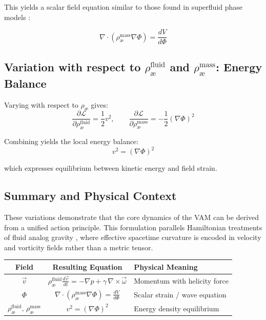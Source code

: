 \documentclass[12pt]{article}
\begin{document}
This yields a scalar field equation similar to those found in superfluid phase models \cite{khalatnikov2000}:

\begin{equation}
    \boxed{
        \nabla \cdot (\rho_\text{\ae}^{\text{mass}} \nabla \Phi) = \frac{dV}{d\Phi}
    }
\end{equation}

\subsection{Variation with respect to \(\rho_\text{\ae}^{\text{fluid}}\) and \(\rho_\text{\ae}^{\text{mass}}\): Energy Balance}

Varying with respect to \( \rho_\text{\ae} \) gives:
\[
    \frac{\partial \mathcal{L}}{\partial \rho_\text{\ae}^{\text{fluid}}} = \frac{1}{2} v^2,
    \qquad
    \frac{\partial \mathcal{L}}{\partial \rho_\text{\ae}^{\text{mass}}} = -\frac{1}{2} (\nabla \Phi)^2
\]

Combining yields the local energy balance:
\begin{equation}
    \boxed{
        v^2 = (\nabla \Phi)^2
    }
\end{equation}

which expresses equilibrium between kinetic energy and field strain.

\subsection*{Summary and Physical Context}

These variations demonstrate that the core dynamics of the VAM can be derived from a unified action principle. This formulation parallels Hamiltonian treatments of fluid analog gravity \cite{barcelo2011}, where effective spacetime curvature is encoded in velocity and vorticity fields rather than a metric tensor.

\begin{center}
    \begin{tabular}{|c|c|l|}
        \hline
        Field & Resulting Equation & Physical Meaning \\
        \hline
       $\vec{v}$ & $\rho_\text{\ae}^{\text{fluid}} \frac{d \vec{v}}{dt} = -\nabla p + \gamma\, \nabla \times \vec{\omega}$ & Momentum with helicity force \\
        $\Phi$ & $\nabla \cdot (\rho_\text{\ae}^{\text{mass}} \nabla \Phi) = \frac{dV}{d\Phi}$ & Scalar strain / wave equation \\
        $\rho_\text{\ae}^{\text{fluid}},\, \rho_\text{\ae}^{\text{mass}}$ & $v^2 = (\nabla \Phi)^2$ & Energy density equilibrium \\
        \hline
    \end{tabular}
\end{center}
\end{document}
